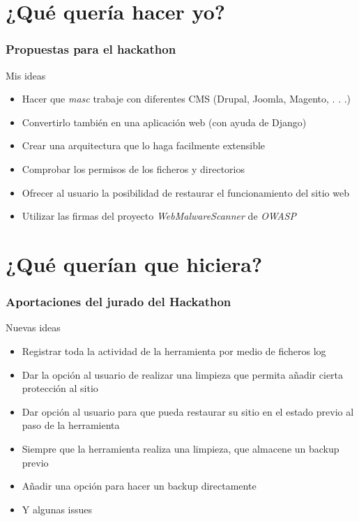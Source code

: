 \documentclass[xcolor={dvipsnames}]{beamer}
\begin{document}
\section{¿Qué quería hacer yo?}
\begin{frame}\frametitle{Propuestas para el hackathon}
    \begin{block}{Mis ideas}
    \begin{itemize}
        \item Hacer que \emph{masc} trabaje con diferentes CMS (Drupal, Joomla, Magento, . . .)
        \item Convertirlo también en una aplicación web (con ayuda de Django)
        \item Crear una arquitectura que lo haga facilmente extensible
        \item Comprobar los permisos de los ficheros y directorios
        \item Ofrecer al usuario la posibilidad de restaurar el funcionamiento del sitio web
        \item Utilizar las firmas del proyecto \emph{WebMalwareScanner} de \emph{OWASP}
    \end{itemize}
    \end{block}
\end{frame}

\section{¿Qué querían que hiciera?}
\begin{frame}\frametitle{Aportaciones del jurado del Hackathon}
    \begin{block}{Nuevas ideas}
    \begin{itemize}
        \item Registrar toda la actividad de la herramienta por medio de ficheros log
        \item Dar la opción al usuario de realizar una limpieza que permita añadir cierta protección al sitio
        \item Dar opción al usuario para que pueda restaurar su sitio en el estado previo al paso de la herramienta
        \item Siempre que la herramienta realiza una limpieza, que almacene un backup previo
        \item Añadir una opción para hacer un backup directamente
        \item Y algunas issues
    \end{itemize}
    \end{block}
\end{frame}
\end{document}
